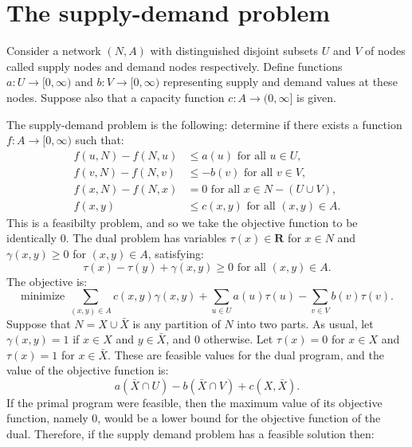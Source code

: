 \documentclass{amsbook}
\newcommand{\RR}{\mathbf R}
\theoremstyle{definition}
\theoremstyle{remark}
\begin{document}
\section{The supply-demand problem}
\label{sec:supply-demand-probl}

Consider a network $(N,A)$ with distinguished disjoint subsets $U$ and $V$ of nodes called supply nodes and demand nodes respectively.
Define functions $a:U\to [0,\infty)$ and $b:V\to [0,\infty)$ representing supply and demand values at these nodes.
Suppose also that a capacity function $c:A\to (0,\infty]$ is given.

The supply-demand problem is the following: determine if there exists a function $f:A\to [0,\infty)$ such that:
\begin{align}
  \tag{SD1}\label{eq:sd1}f(u,N)-f(N,u) & \leq a(u) \text{ for all }u\in U,\\
  \tag{SD2}\label{eq:sd2}f(v,N)-f(N,v) & \leq -b(v) \text{ for all }v\in V,\\
  \tag{SD3}\label{eq:sd3}f(x,N)-f(N,x) & = 0 \text{ for all }x\in N-(U\cup V),\\
  \tag{SD4}\label{eq:sd4}f(x,y) & \leq c(x,y) \text{ for all } (x,y)\in A.
\end{align}
This is a feasibilty problem, and so we take the objective function to be identically $0$.
The dual problem has variables $\tau(x)\in \RR$ for $x\in N$ and $\gamma(x,y)\geq 0$ for $(x,y)\in A$, satisfying:
\begin{displaymath}
  \tau(x)-\tau(y)+\gamma(x,y)\geq 0 \text{ for all } (x,y)\in A.
\end{displaymath}
The objective is:
\begin{displaymath}
  \text{minimize } \sum_{(x,y)\in A} c(x,y)\gamma(x,y)+\sum_{u\in U}a(u)\tau(u)-\sum_{v\in V}b(v)\tau(v).
\end{displaymath}
Suppose that $N=X\cup \bar X$ is any partition of $N$ into two parts.
As usual, let $\gamma(x,y)=1$ if $x\in X$ and $y\in \bar X$, and $0$ otherwise.
Let $\tau(x)=0$ for $x\in X$ and $\tau(x)=1$ for $x\in \bar X$.
These are feasible values for the dual program, and the value of the objective function is:
\begin{displaymath}
  a(\bar X\cap U) - b(\bar X\cap V) + c(X,\bar X). 
\end{displaymath}
If the primal program were feasible, then the maximum value of its objective function, namely $0$, would be a lower bound for the objective function of the dual.
Therefore, if the supply demand problem has a feasible solution then:
\end{document}
